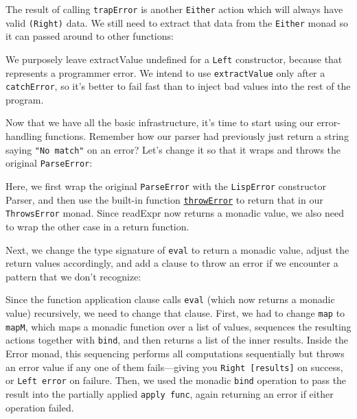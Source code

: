  
The result of calling \verb|trapError| is another \verb|Either| action which will always have valid \verb|(Right)| data. We still need to extract that data from the \verb|Either| monad so it can passed around to other functions:
 
 
We purposely leave extractValue undefined for a \verb|Left| constructor, because that represents a programmer error. We intend to use \verb|extractValue| only after a \verb|catchError|, so it's better to fail fast than to inject bad values into the rest of the program.
 
Now that we have all the basic infrastructure, it's time to start using our error-handling functions. Remember how our parser had previously just return a string saying \lstinline|"No match"| on an error? Let's change it so that it wraps and throws the original \verb|ParseError|:
 
 
Here, we first wrap the original \verb|ParseError| with the \verb|LispError| constructor Parser, and then use the built-in function \href{http://www.haskell.org/ghc/docs/latest/html/libraries/mtl/Control-Monad-Error.html\#v\%3AthrowError}{\texttt{throwError}} to return that in our \verb|ThrowsError| monad. Since readExpr now returns a monadic value, we also need to wrap the other case in a return function.
 
Next, we change the type signature of \verb|eval| to return a monadic value, adjust the return values accordingly, and add a clause to throw an error if we encounter a pattern that we don't recognize:
 
 
Since the function application clause calls \verb|eval| (which now returns a monadic value) recursively, we need to change that clause. First, we had to change \verb|map| to \verb|mapM|, which maps a monadic function over a list of values, sequences the resulting actions together with \verb|bind|, and then returns a list of the inner results. Inside the Error monad, this sequencing performs all computations sequentially but throws an error value if any one of them fails---giving you \verb|Right [results]| on success, or \verb|Left error| on failure. Then, we used the monadic \verb|bind| operation to pass the result into the partially applied \verb|apply func|, again returning an error if either operation failed.
 
